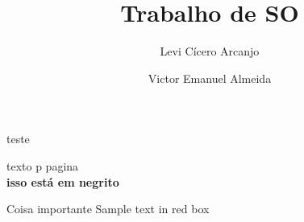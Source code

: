 \documentclass{beamer}
\author[Levi, Victor]{Levi Cícero Arcanjo  \and Victor Emanuel Almeida}
\title{Trabalho de SO}
\begin{document}
	\frame{\titlepage}

\begin{frame}
	teste
	
\end{frame}

	\begin{frame}
		texto p pagina \thepage\\
		\textbf{isso está em negrito}

		\begin{alertblock}{Coisa importante}
			Sample text in red box
		\end{alertblock}
	\end{frame}
\end{document}
